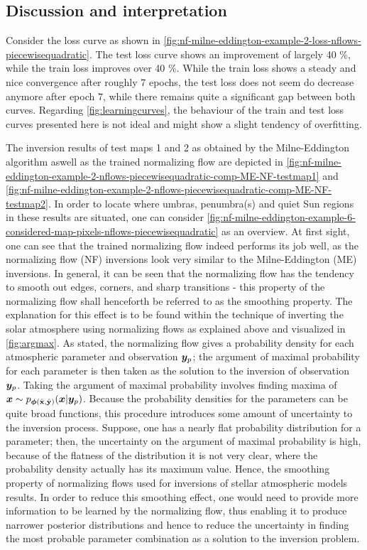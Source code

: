 \documentclass[a4paper,12pt]{report}
\begin{document}
\subsection{Discussion and interpretation}
Consider the loss curve as shown in \cref{fig:nf-milne-eddington-example-2-loss-nflows-piecewisequadratic}. The test loss curve shows an improvement of largely 40 \%, while the train loss improves over 40 \%. While the train loss shows a steady and nice convergence after roughly 7 epochs, the test loss does not seem do decrease anymore after epoch 7, while there remains quite a significant gap between both curves. Regarding \cref{fig:learningcurves}, the behaviour of the train and test loss curves presented here is not ideal and might show a slight tendency of overfitting.

The inversion results of test maps 1 and 2 as obtained by the Milne-Eddington algorithm aswell as the trained normalizing flow are depicted in \cref{fig:nf-milne-eddington-example-2-nflows-piecewisequadratic-comp-ME-NF-testmap1} and \cref{fig:nf-milne-eddington-example-2-nflows-piecewisequadratic-comp-ME-NF-testmap2}. In order to locate where umbras, penumbra(s) and quiet Sun regions in these results are situated, one can consider \cref{fig:nf-milne-eddington-example-6-considered-map-pixels-nflows-piecewisequadratic} as an overview. At first sight, one can see that the trained normalizing flow indeed performs its job well, as the normalizing flow (NF) inversions look very similar to the Milne-Eddington (ME) inversions. In general, it can be seen that the normalizing flow has the tendency to smooth out edges, corners, and sharp transitions - this property of the normalizing flow shall henceforth be referred to as the smoothing property. The explanation for this effect is to be found within the technique of inverting the solar atmosphere using normalizing flows as explained above and visualized in \cref{fig:argmax}. As stated, the normalizing flow gives a probability density for each atmospheric parameter and observation $\bm{y}_p$; the argument of maximal probability for each parameter is then taken as the solution to the inversion of observation $\bm{y}_p$. Taking the argument of maximal probability involves finding maxima of $\bm{x} \sim p_{\bm{\phi}(\hat{\boldsymbol{\mathbf{x}}},\hat{\boldsymbol{\mathbf{y}}})}(\bm{x}|\bm{y}_p)$. Because the probability densities for the parameters can be quite broad functions, this procedure introduces some amount of uncertainty to the inversion process. Suppose, one has a nearly flat probability distribution for a parameter; then, the uncertainty on the argument of maximal probability is high, because of the flatness of the distribution it is not very clear, where the probability density actually has its maximum value. Hence, the smoothing property of normalizing flows used for inversions of stellar atmospheric models results. In order to reduce this smoothing effect, one would need to provide more information to be learned by the normalizing flow, thus enabling it to produce narrower posterior distributions and hence to reduce the uncertainty in finding the most probable parameter combination as a solution to the inversion problem.
\end{document}
